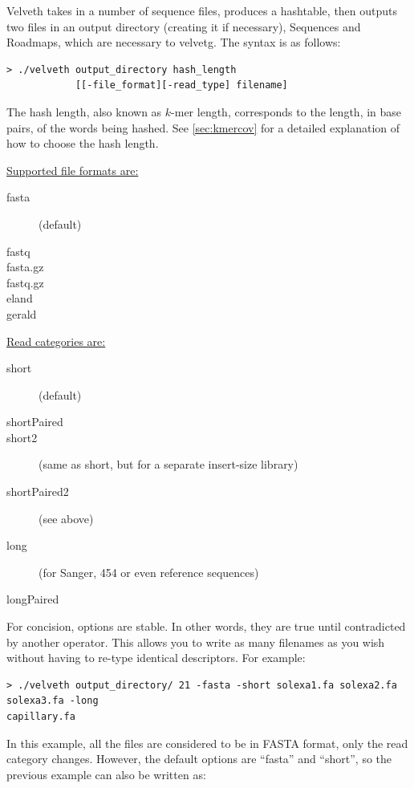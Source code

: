 \documentclass{article}
\begin{document}
\label{sec:hashing}

Velveth takes in a number of sequence files, produces a hashtable, then outputs two files in an output directory (creating it if necessary), Sequences and Roadmaps, which are necessary to velvetg. The syntax is as follows:

\begin{verbatim}
> ./velveth output_directory hash_length 
            [[-file_format][-read_type] filename]
\end{verbatim}

The hash length, also known as $k$-mer length, corresponds to the length, in base pairs, of the words being hashed. See \ref{sec:kmercov} for a detailed explanation of how to choose the hash length.

\underline{Supported file formats are:}
\begin{description}
\item[fasta] (default) 
\item[fastq]
\item[fasta.gz]
\item[fastq.gz]
\item[eland]
\item[gerald]
\end{description}

\underline{Read categories are:}
\begin{description}
\item[short] (default)
\item[shortPaired]
\item[short2] (same as short, but for a separate insert-size library)
\item[shortPaired2] (see above) 
\item[long] (for Sanger, 454 or even reference sequences)
\item[longPaired]
\end{description}

For concision, options are stable. In other words, they are true until
contradicted by another operator. This allows you to write as many filenames
as you wish without having to re-type identical descriptors.  For example:
\begin{verbatim}
> ./velveth output_directory/ 21 -fasta -short solexa1.fa solexa2.fa solexa3.fa -long
capillary.fa
\end{verbatim}

In this example, all the files are considered to be in FASTA format,
only the read category changes. However, the default options are ``fasta'' and ``short'', so the previous example
can also be written as:
\end{document}
